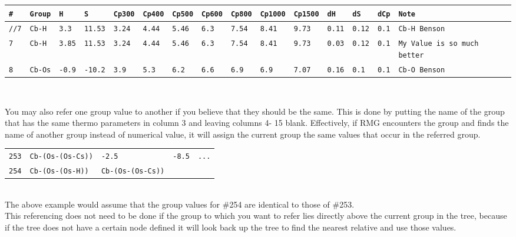 \documentclass[12pt,letterpaper]{article}
\begin{document}
{\tiny{
\begin{tabular}{lllllllllllllll}
\texttt{\#} & \texttt{Group} & \texttt{H} & \texttt{S} & \texttt{Cp300} & \texttt{Cp400} & \texttt{Cp500} & \texttt{Cp600} & \texttt{Cp800} & \texttt{Cp1000} & \texttt{Cp1500} & \texttt{dH} & \texttt{dS} & \texttt{dCp} & \texttt{Note} \\ \hline
\texttt{//7} & \texttt{Cb-H} & \texttt{3.3} & \texttt{11.53} & \texttt{3.24} & \texttt{4.44} & \texttt{5.46} & \texttt{6.3} & \texttt{7.54} & \texttt{8.41} & \texttt{9.73} & \texttt{0.11} & \texttt{0.12} & \texttt{0.1} & \texttt{Cb-H Benson} \\
\texttt{7} & \texttt{Cb-H} & \texttt{3.85} & \texttt{11.53} & \texttt{3.24} & \texttt{4.44} & \texttt{5.46} & \texttt{6.3} & \texttt{7.54} & \texttt{8.41} & \texttt{9.73} & \texttt{0.03} & \texttt{0.12} & \texttt{0.1} & \texttt{My Value is so much better} \\
\texttt{8} & \texttt{Cb-Os} & \texttt{-0.9} & \texttt{-10.2} & \texttt{3.9} & \texttt{5.3} & \texttt{6.2} & \texttt{6.6} & \texttt{6.9} & \texttt{6.9} & \texttt{7.07} & \texttt{0.16} & \texttt{0.1} & \texttt{0.1} & \texttt{Cb-O Benson} \\
\end{tabular}\\
}}

You may also refer one group value to another if you believe that they
should be the same. This is done by putting the name of the group
that has the same thermo parameters in column 3 and leaving columns 4-
15 blank. Effectively, if RMG encounters the group and finds the name of
another group instead of numerical value, it will assign the current group the
same values that occur in the referred group.\\

\begin{tabular}{lllll}
\texttt{253} & \texttt{Cb-(Os-(Os-Cs))} & \texttt{-2.5} & \texttt{-8.5} & \texttt{...} \\
\texttt{254} & \texttt{Cb-(Os-(Os-H))} & \texttt{Cb-(Os-(Os-Cs))} &
\end{tabular} \\

The above example would assume that the group values for \#254 are
identical to those of \#253.\\

This referencing does not need to be done if the group to which you want
to refer lies directly above the current group in the tree, because if the tree
does not have a certain node defined it will look back up the tree to find the
nearest relative and use those values.\\
\end{document}
